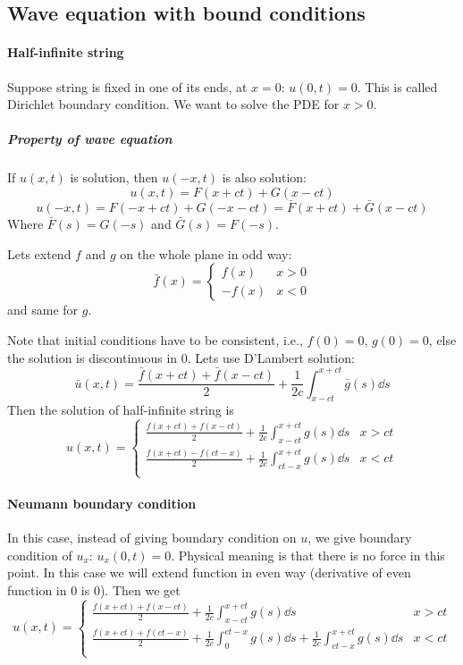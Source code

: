 \subsection{Wave equation with bound conditions}
\paragraph{Half-infinite string}
Suppose string is fixed in one of its ends, at $x=0$: $u(0,t) = 0$. This is called Dirichlet boundary condition. We want to solve the PDE for $x>0$.

\subparagraph{Property of wave equation}
If $u(x,t)$ is solution, then $u(-x,t)$ is also solution:
$$u(x,t) = F(x+ct) + G(x-ct)$$
$$u(-x,t) = F(-x+ct)+G(-x-ct) = \bar{F}(x+ct) + \bar{G}(x-ct)$$
Where $\bar{F}(s) = G(-s)$ and $\bar{G}(s) = F(-s)$.

Lets extend $f$ and $g$ on the whole plane in odd way:
$$\bar{f}(x) = \begin{cases}
f(x) & x>0\\
-f(x) & x<0
\end{cases}$$
and same for $g$. 

Note that initial conditions have to be consistent, i.e., $f(0)=0$, $g(0)=0$, else the solution is discontinuous in 0.
Lets use D'Lambert solution:
$$\bar{u}(x,t) = \frac{\bar{f}(x+ct) + \bar{f}(x-ct)}{2} + \frac{1}{2c} \int_{x-ct}^{x+ct} \bar{g}(s) \dd{s}$$
Then the solution of half-infinite string is
$$u(x,t) = \begin{cases}
\frac{f(x+ct) + f(x-ct)}{2} + \frac{1}{2c} \int_{x-ct}^{x+ct} g(s) \dd{s}& x>ct\\
\frac{f(x+ct) - f(ct-x)}{2} + \frac{1}{2c} \int_{ct-x}^{x+ct} g(s) \dd{s}& x<ct\\
\end{cases}$$ 
\paragraph{Neumann boundary condition}
In this case, instead of giving boundary condition on $u$, we give boundary condition of $u_x$: $u_x(0,t) = 0$. Physical meaning is that there is no force in this point. In this case we will extend function in even way (derivative of even function in 0 is 0). Then we get$$u(x,t) = \begin{cases}
\frac{f(x+ct) + f(x-ct)}{2} + \frac{1}{2c} \int_{x-ct}^{x+ct} g(s) \dd{s}& x>ct\\
\frac{f(x+ct) + f(ct-x)}{2} + \frac{1}{2c} \int_{0}^{ct-x} g(s) \dd{s} + \frac{1}{2c} \int_{ct-x}^{x+ct} g(s) \dd{s}& x<ct\\
\end{cases}$$ 
